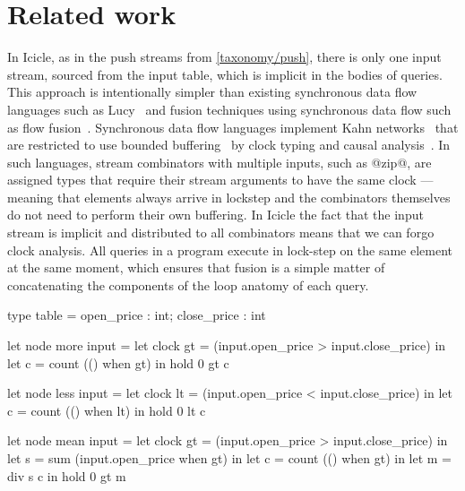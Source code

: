 \section{Related work}
\label{icicle:s:Conclusion}


In Icicle, as in the push streams from \cref{taxonomy/push}, there is only one input stream, sourced from the input table, which is implicit in the bodies of queries.
This approach is intentionally simpler than existing synchronous data flow languages such as Lucy~\cite{mandel2010lucy} and fusion techniques using synchronous data flow such as flow fusion~\cite{lippmeier2013data}.
Synchronous data flow languages implement Kahn networks~\cite{vrba2009kahn} that are restricted to use bounded buffering~\cite{johnston2004advances} by clock typing and causal analysis~\cite{stephens1997survey}.
In such languages, stream combinators with multiple inputs, such as @zip@, are assigned types that require their stream arguments to have the same clock --- meaning that elements always arrive in lockstep and the combinators themselves do not need to perform their own buffering.
In Icicle the fact that the input stream is implicit and distributed to all combinators means that we can forgo clock analysis.
All queries in a program execute in lock-step on the same element at the same moment, which ensures that fusion is a simple matter of concatenating the components of the loop anatomy of each query.

\begin{lucy}[float,caption=Lucid-Synchrone implementation of stocks queries,label=icicle:fig:related:lucy:stocks]
type table = { open_price : int; close_price : int }

let node more input =
 let clock gt = (input.open_price > input.close_price)
 in let c     = count (() when gt)
 in hold 0 gt c

let node less input =
 let clock lt = (input.open_price < input.close_price)
 in let c     = count (() when lt)
 in hold 0 lt c

let node mean input =
 let clock gt = (input.open_price > input.close_price)
 in let s     = sum (input.open_price when gt)
 in let c     = count (() when gt)
 in let m     = div s c
 in hold 0 gt m
\end{lucy}

